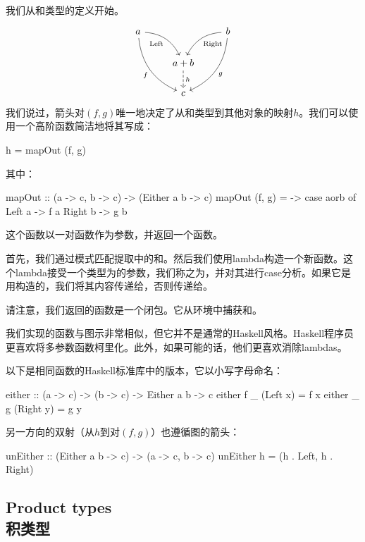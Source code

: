 \documentclass[DaoFP]{subfiles}
\begin{document}
我们从和类型的定义开始。
\[
\begin{tikzcd}
a
\arrow[dr,  bend left, "\text{Left}"']
\arrow[ddr, bend right, "f"']
&& b
\arrow[dl, bend right, "\text{Right}"]
\arrow[ddl, bend left, "g"]
\\
&a + b
\arrow[d, dashed, "h"]
\\
& c
\end{tikzcd}
\]
我们说过，箭头对$(f, g)$唯一地决定了从和类型到其他对象的映射$h$。我们可以使用一个高阶函数简洁地将其写成：
\begin{haskell}
h = mapOut (f, g)
\end{haskell}
其中：
\begin{haskell}
mapOut :: (a -> c, b -> c) -> (Either a b -> c)
mapOut (f, g) = \aorb -> case aorb of
Left  a -> f a
Right b -> g b
\end{haskell}
这个函数以一对函数作为参数，并返回一个函数。

首先，我们通过模式匹配提取中的和。然后我们使用lambda构造一个新函数。这个lambda接受一个类型为的参数，我们称之为，并对其进行case分析。如果它是用构造的，我们将其内容传递给，否则传递给。

请注意，我们返回的函数是一个闭包。它从环境中捕获和。

我们实现的函数与图示非常相似，但它并不是通常的Haskell风格。Haskell程序员更喜欢将多参数函数柯里化。此外，如果可能的话，他们更喜欢消除lambdas。

以下是相同函数的Haskell标准库中的版本，它以小写字母命名：
\begin{haskell}
either :: (a -> c) -> (b -> c) -> Either a b -> c
either f _ (Left x)     =  f x
either _ g (Right y)    =  g y
\end{haskell}
另一方向的双射（从$h$到对$(f, g)$）也遵循图的箭头：

\begin{haskell}
unEither :: (Either a b -> c) -> (a -> c, b -> c)
unEither h = (h . Left, h . Right)
\end{haskell}

\subsection{Product types\\积类型}
\end{document}
